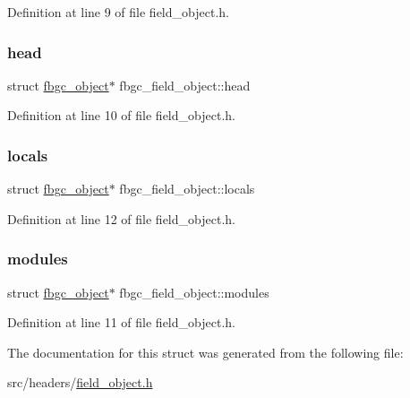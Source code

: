 Definition at line 9 of file field\+\_\+object.\+h.

\mbox{\label{structfbgc__field__object_a5661b6bc4d219b6358bb69e67ca9737d}} 
\subsubsection{\texorpdfstring{head}{head}}
{\footnotesize\ttfamily struct \hyperlink{structfbgc__object}{fbgc\+\_\+object}$\ast$ fbgc\+\_\+field\+\_\+object\+::head}



Definition at line 10 of file field\+\_\+object.\+h.

\mbox{\label{structfbgc__field__object_aab85ff02efee9aadc0e3370aa49234d5}} 
\subsubsection{\texorpdfstring{locals}{locals}}
{\footnotesize\ttfamily struct \hyperlink{structfbgc__object}{fbgc\+\_\+object}$\ast$ fbgc\+\_\+field\+\_\+object\+::locals}



Definition at line 12 of file field\+\_\+object.\+h.

\mbox{\label{structfbgc__field__object_a398da35ea508623d00bb92bf2aee7eef}} 
\subsubsection{\texorpdfstring{modules}{modules}}
{\footnotesize\ttfamily struct \hyperlink{structfbgc__object}{fbgc\+\_\+object}$\ast$ fbgc\+\_\+field\+\_\+object\+::modules}



Definition at line 11 of file field\+\_\+object.\+h.



The documentation for this struct was generated from the following file\+:\begin{DoxyCompactItemize}
\item 
src/headers/\hyperlink{field__object_8h}{field\+\_\+object.\+h}\end{DoxyCompactItemize}

